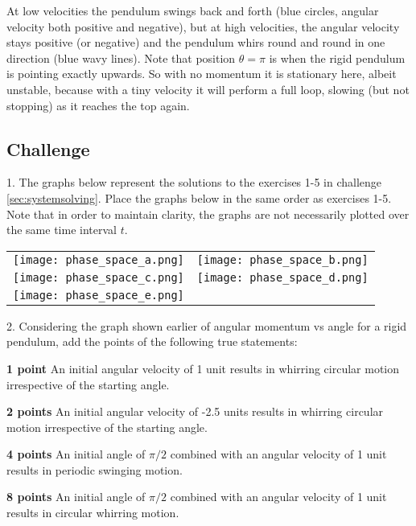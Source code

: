 At low velocities the pendulum swings back and forth (blue circles, angular velocity both positive and negative), but at high velocities, the angular velocity stays positive (or negative) and the pendulum whirs round and round in one direction (blue wavy lines). Note that position $\theta = \pi$ is when the rigid pendulum is pointing exactly upwards. So with no momentum it is stationary here, albeit unstable, because with a tiny velocity it will perform a full loop, slowing (but not stopping) as it reaches the top again.

\subsection*{Challenge}
1. The graphs below represent the solutions to the exercises 1-5 in challenge \ref{sec:systemsolving}.
Place the graphs below in the same order as exercises 1-5. Note that in order to maintain clarity, the graphs are not necessarily plotted over the same time interval $t$.

\begin{tabular}{cc}
    \texttt{[image: phase\_space\_a.png]} &
    \texttt{[image: phase\_space\_b.png]} \\
    \texttt{[image: phase\_space\_c.png]} &
    \texttt{[image: phase\_space\_d.png]} \\
    \texttt{[image: phase\_space\_e.png]} &
\end{tabular}

\vspace{1cm}
2. Considering the graph shown earlier of angular momentum vs angle for a rigid pendulum, add the points of the following true statements:

\textbf{1 point} An initial angular velocity of 1 unit results in whirring circular motion irrespective of the starting angle.

\textbf{2 points} An initial angular velocity of -2.5 units results in whirring circular motion irrespective of the starting angle.

\textbf{4 points} An initial angle of $\pi/2$ combined with an angular velocity of 1 unit results in periodic swinging motion.

\textbf{8 points} An initial angle of $\pi/2$ combined with an angular velocity of 1 unit results in circular whirring motion.

